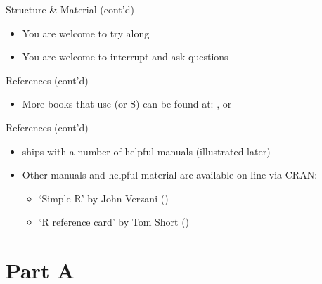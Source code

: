 \documentclass[14pt, aspectratio=169, sectionpage=simple, xclolor=table]{beamer}
\begin{document}
\begin{frame}{Structure \& Material (cont'd)}
\begin{itemize}
	\item You are welcome to try along
	\nl
	\item You are welcome to interrupt and ask questions
\end{itemize}
\end{frame}
\begin{frame}{References (cont'd)}
\begin{itemize}
	\item More books that use \R (or S) can be found at:
	, or\\
\end{itemize}
\end{frame}
\begin{frame}[fragile]{References (cont'd)}
\begin{itemize}
	\item \R ships with a number of helpful manuals (illustrated later)
	\item Other manuals and helpful material are available on-line
	via CRAN:\\
	\begin{itemize}
		\item `Simple R' by John Verzani
		()
		\item `R reference card' by Tom Short
		()
	\end{itemize}
\end{itemize}
\end{frame}
\section{Part A}
\end{document}
